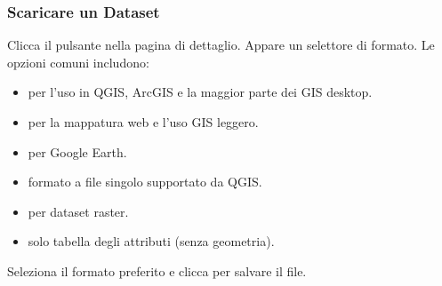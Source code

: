 \documentclass[letterpaper,10pt,english]{sphinxmanual}
\begin{document}
\subsubsection{Scaricare un Dataset}
\label{\detokenize{it/02_trovare_visualizzare:scaricare-un-dataset}}
\sphinxAtStartPar
Clicca il pulsante  nella pagina di dettaglio. Appare un selettore di
formato. Le opzioni comuni includono:
\begin{itemize}
\item {} 
\sphinxAtStartPar
{} \textendash{} per l’uso in QGIS, ArcGIS e la maggior parte dei GIS desktop.

\item {} 
\sphinxAtStartPar
{} \textendash{} per la mappatura web e l’uso GIS leggero.

\item {} 
\sphinxAtStartPar
{} \textendash{} per Google Earth.

\item {} 
\sphinxAtStartPar
{} \textendash{} formato a file singolo supportato da QGIS.

\item {} 
\sphinxAtStartPar
{} \textendash{} per dataset raster.

\item {} 
\sphinxAtStartPar
{} \textendash{} solo tabella degli attributi (senza geometria).

\end{itemize}

\sphinxAtStartPar
Seleziona il formato preferito e clicca  per salvare il file.

\sphinxstepscope
\end{document}
